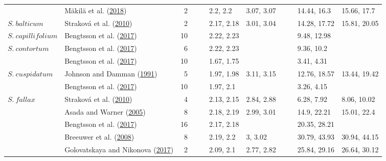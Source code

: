\documentclass[
  12pt,
]{article}
\begin{document}
\begin{table}[H]
{\begin{tabular}[t]{llrllllllll}
 & Mäkilä et al. (\protect\hyperlink{ref-Makila.2018}{2018}) & 2 &  &  & 2.2, 2.2 & 3.07, 3.07 &  &  & 14.44, 16.3 & 15.66, 17.7\\

\multirow[t]{-4}{*}{\raggedright\arraybackslash $S.~balticum$} & Straková et al. (\protect\hyperlink{ref-Strakova.2010}{2010}) & 2 &  &  & 2.17, 2.18 & 3.01, 3.04 &  &  & 14.28, 17.72 & 15.81, 20.05\\
\cmidrule{1-11}
$S.~capillifolium$ & Bengtsson et al. (\protect\hyperlink{ref-Bengtsson.2017}{2017}) & 10 &  &  & 2.22, 2.23 &  &  &  & 9.48, 12.98 & \\
\cmidrule{1-11}
$S.~contortum$ & Bengtsson et al. (\protect\hyperlink{ref-Bengtsson.2017}{2017}) & 6 &  &  & 2.22, 2.23 &  &  &  & 9.36, 10.2 & \\
\cmidrule{1-11}
 & Bengtsson et al. (\protect\hyperlink{ref-Bengtsson.2017}{2017}) & 10 &  &  & 1.67, 1.75 &  &  &  & 3.41, 4.31 & \\

\multirow[t]{-2}{*}{\raggedright\arraybackslash $S.~cuspidatum$} & Johnson and Damman (\protect\hyperlink{ref-Johnson.1991}{1991}) & 5 &  &  & 1.97, 1.98 & 3.11, 3.15 &  &  & 12.76, 18.57 & 13.44, 19.42\\
\cmidrule{1-11}
 & Bengtsson et al. (\protect\hyperlink{ref-Bengtsson.2017}{2017}) & 10 &  &  & 1.97, 2.1 &  &  &  & 3.26, 4.15 & \\

\multirow[t]{-2}{*}{\raggedright\arraybackslash $S.~fallax$} & Straková et al. (\protect\hyperlink{ref-Strakova.2010}{2010}) & 4 &  &  & 2.13, 2.15 & 2.84, 2.88 &  &  & 6.28, 7.92 & 8.06, 10.02\\
\cmidrule{1-11}
 & Asada and Warner (\protect\hyperlink{ref-Asada.2005b}{2005}) & 8 &  &  & 2.18, 2.19 & 2.99, 3.01 &  &  & 14.9, 22.21 & 15.01, 22.4\\

 & Bengtsson et al. (\protect\hyperlink{ref-Bengtsson.2017}{2017}) & 16 &  &  & 2.17, 2.18 &  &  &  & 20.35, 28.21 & \\

 & Breeuwer et al. (\protect\hyperlink{ref-Breeuwer.2008}{2008}) & 8 &  &  & 2.19, 2.2 & 3, 3.02 &  &  & 30.79, 43.93 & 30.94, 44.15\\

 & Golovatskaya and Nikonova (\protect\hyperlink{ref-Golovatskaya.2017}{2017}) & 2 &  &  & 2.09, 2.1 & 2.77, 2.82 &  &  & 25.84, 29.16 & 26.64, 30.12\\


\end{tabular}}
\end{table}
\end{document}
